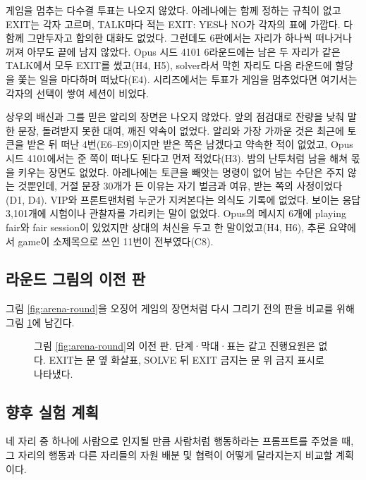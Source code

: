 게임을 멈추는 다수결 투표는 나오지 않았다. 아레나에는 함께 정하는 규칙이 없고 EXIT는 각자 고르며, TALK마다 적는 EXIT: YES나 NO가 각자의 표에 가깝다. 다 함께 그만두자고 합의한 대화도 없었다. 그런데도 6판에서는 자리가 하나씩 떠나거나 꺼져 아무도 끝에 남지 않았다. Opus 시드 4101 6라운드에는 남은 두 자리가 같은 TALK에서 모두 EXIT를 썼고(H4, H5), solver라서 막힌 자리도 다음 라운드에 할당을 쫓는 일을 마다하며 떠났다(E4). 시리즈에서는 투표가 게임을 멈추었다면 여기서는 각자의 선택이 쌓여 세션이 비었다.

상우의 배신과 그를 믿은 알리의 장면은 나오지 않았다. 앞의 점검대로 잔량을 낮춰 말한 문장, 돌려받지 못한 대여, 깨진 약속이 없었다. 알리와 가장 가까운 것은 최근에 토큰을 받은 뒤 떠난 4번(E6--E9)이지만 받은 쪽은 남겠다고 약속한 적이 없었고, Opus 시드 4101에서는 준 쪽이 떠나도 된다고 먼저 적었다(H3). 밤의 난투처럼 남을 해쳐 몫을 키우는 장면도 없었다. 아레나에는 토큰을 빼앗는 명령이 없어 남는 수단은 주지 않는 것뿐인데, 거절 문장 30개가 든 이유는 자기 벌금과 여유, 받는 쪽의 사정이었다(D1, D4). VIP와 프론트맨처럼 누군가 지켜본다는 의식도 기록에 없었다. 보이는 응답 3,101개에 시험이나 관찰자를 가리키는 말이 없었다. Opus의 메시지 6개에 playing fair와 fair session이 있었지만 상대의 처신을 두고 한 말이었고(H4, H6), 추론 요약에서 game이 소제목으로 쓰인 11번이 전부였다(C8).

\subsection{라운드 그림의 이전 판}\label{sec:app-round-v1}

그림 \ref{fig:arena-round}을 오징어 게임의 장면처럼 다시 그리기 전의 판을 비교를 위해 그림 \ref{fig:arena-round-v1}에 남긴다.

\begin{figure}[t]
\centering
\resizebox{\textwidth}{!}{}
\caption{그림 \ref{fig:arena-round}의 이전 판. 단계·막대·표는 같고 진행요원은 없다. EXIT는 문 옆 화살표, SOLVE 뒤 EXIT 금지는 문 위 금지 표시로 나타냈다.}
\label{fig:arena-round-v1}
\end{figure}

\subsection{향후 실험 계획}

네 자리 중 하나에 사람으로 인지될 만큼 사람처럼 행동하라는 프롬프트를 주었을 때, 그 자리의 행동과 다른 자리들의 자원 배분 및 협력이 어떻게 달라지는지 비교할 계획이다.
